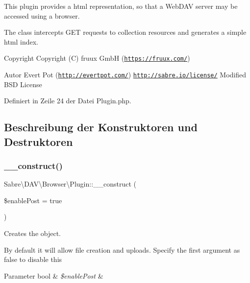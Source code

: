 This plugin provides a html representation, so that a Web\+D\+AV server may be accessed using a browser.

The class intercepts G\+ET requests to collection resources and generates a simple html index.

\begin{DoxyCopyright}{Copyright}
Copyright (C) fruux GmbH (\href{https://fruux.com/}{\tt https\+://fruux.\+com/}) 
\end{DoxyCopyright}
\begin{DoxyAuthor}{Autor}
Evert Pot (\href{http://evertpot.com/}{\tt http\+://evertpot.\+com/})  \href{http://sabre.io/license/}{\tt http\+://sabre.\+io/license/} Modified B\+SD License 
\end{DoxyAuthor}


Definiert in Zeile 24 der Datei Plugin.\+php.



\subsection{Beschreibung der Konstruktoren und Destruktoren}
\mbox{\label{class_sabre_1_1_d_a_v_1_1_browser_1_1_plugin_a9690b32ff1c49845700ae232457d40d7}} 
\subsubsection{\texorpdfstring{\+\_\+\+\_\+construct()}{\_\_construct()}}
{\footnotesize\ttfamily Sabre\textbackslash{}\+D\+A\+V\textbackslash{}\+Browser\textbackslash{}\+Plugin\+::\+\_\+\+\_\+construct (\begin{DoxyParamCaption}\item[{}]{\$enable\+Post = {\ttfamily true} }\end{DoxyParamCaption})}

Creates the object.

By default it will allow file creation and uploads. Specify the first argument as false to disable this


\begin{DoxyParams}[1]{Parameter}
bool & {\em \$enable\+Post} & \\
\hline
\end{DoxyParams}


